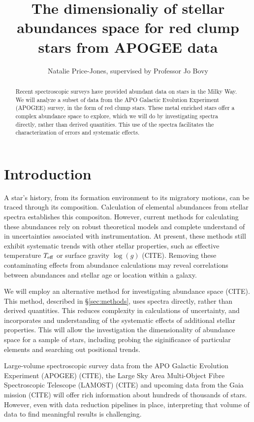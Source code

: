 \documentclass[preprint]{aastex}
\begin{document}
\title{The dimensionaliy of stellar abundances space for red clump stars from APOGEE data}
\author{Natalie Price-Jones, supervised by Professor Jo Bovy}

\begin{abstract}
Recent spectroscopic surveys have provided abundant data on stars in the Milky Way. We will analyze a subset of data from the APO Galactic Evolution Experiment (APOGEE) survey, in the form of red clump stars. These metal enriched stars offer a complex abundance space to explore, which we will do by investigating spectra directly, rather than derived quantities. This use of the spectra facilitates the characterization of errors and systematic effects.  

\end{abstract}

\section{Introduction}
\label{sec:back}
A star's history, from its formation environment to its migratory motions, can be traced through its composition. Calculation of elemental abundances from stellar spectra establishes this compositon. However, current methods for calculating these abundances rely on robust theoretical models and complete understand of in uncertainties associated with instrumentation. At present, these methods still exhibit systematic trends with other stellar properties, such as effective temperature $T_{\rm eff}$ or surface gravity $\log(g)$ (CITE). Removing these contaminating effects from abundance calculations may reveal correlations between abundances and stellar age or location within a galaxy. 

We will employ an alternative method for investigating abundance space (CITE). This method, described in \S\ref{sec:methods}, uses spectra directly, rather than derived quantities. This reduces complexity in calculations of uncertainty, and incorporates and understanding of the systematic effects of additional stellar properties. This will allow the investigation the dimensionality of abundance space for a sample of stars, including probing the siginificance of particular elements and searching out positional trends.

Large-volume spectroscopic survey data from the APO Galactic Evolution Experiment (APOGEE) (CITE), the Large Sky Area Multi-Object Fibre Spectroscopic Telescope (LAMOST) (CITE) and upcoming data from the Gaia mission (CITE) will offer rich information about hundreds of thousands of stars. However, even with data reduction pipelines in place, interpreting that volume of data to find meaningful results is challenging. 
\end{document}
